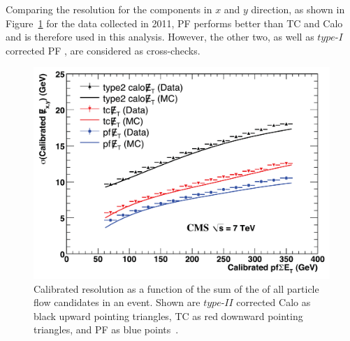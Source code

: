 Comparing the resolution for the \MET components in $x$ and $y$ direction, as shown in Figure~\ref{fig:METReso} for the data collected in 2011, PF \MET performs better than TC and Calo \MET and is therefore used in this analysis. However, the other two, as well as $\textit{type-I}$ corrected PF \MET, are considered as cross-checks. 
\begin{figure}[htb]
\begin{center}
\includegraphics[scale=0.2]{plots/RECO/METResolution.png}
\caption{Calibrated \MET resolution as a function of the sum of the \Et of all particle flow candidates in an event. Shown are $\textit{type-II}$ corrected Calo \MET as black upward pointing triangles, TC \MET as red downward pointing triangles, and PF \MET as blue points~\cite{7TeVMETPaper}.}
\label{fig:METReso}
\end{center}
\end{figure}


